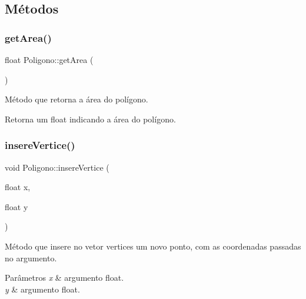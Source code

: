 \subsection{Métodos}
\mbox{\label{classPoligono_ab1a85a090e7442bf3151602b05da9e19}} 
\subsubsection{\texorpdfstring{get\+Area()}{getArea()}}
{\footnotesize\ttfamily float Poligono\+::get\+Area (\begin{DoxyParamCaption}{ }\end{DoxyParamCaption})}



Método que retorna a área do polígono. 

\begin{DoxyReturn}{Retorna}
um float indicando a área do polígono. 
\end{DoxyReturn}
\mbox{\label{classPoligono_aeaad76667207d96ea0d69c2dfb3bc2a9}} 
\subsubsection{\texorpdfstring{insere\+Vertice()}{insereVertice()}}
{\footnotesize\ttfamily void Poligono\+::insere\+Vertice (\begin{DoxyParamCaption}\item[{float}]{x,  }\item[{float}]{y }\end{DoxyParamCaption})}



Método que insere no vetor \textquotesingle{}vertices\textquotesingle{} um novo ponto, com as coordenadas passadas no argumento. 


\begin{DoxyParams}{Parâmetros}
{\em x} & argumento float. \\
\hline
{\em y} & argumento float. \\
\hline
\end{DoxyParams}
\mbox{\label{classPoligono_ae2c1c915b4a72104724d1302138e7caa}} 
